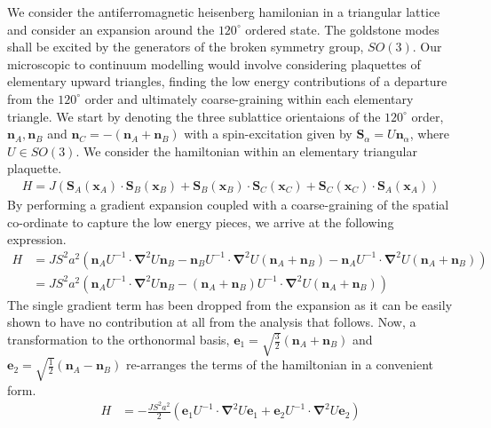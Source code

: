 \documentclass[notitlepage,onecolumn,showpacs,11pt]{revtex4-1}
\newcommand{\mbf}[1]{\mathbf{#1}}
\newcommand{\grad}{\boldsymbol{\nabla}}
\begin{document}
We consider the antiferromagnetic heisenberg hamilonian in a triangular lattice and consider 
an expansion around the $120^\circ$ ordered state. The goldstone modes shall be excited by
the generators of the broken symmetry group, $SO(3)$. Our microscopic to continuum modelling 
would involve considering plaquettes of elementary upward triangles, finding the low energy
contributions of a departure from the $120^\circ$ order and ultimately coarse-graining within 
each elementary triangle. We start by denoting the three sublattice orientaions of the 
$120^\circ$ order, $\mbf{n}_A,\mbf{n}_B$ and $\mbf{n}_C = -(\mbf{n}_A+\mbf{n}_B)$ with a
spin-excitation given by $\mbf{S}_\alpha=U\mbf{n}_\alpha$, where $U\in SO(3)$. We consider the
hamiltonian within an elementary triangular plaquette.
\begin{equation}
    \begin{aligned}
        H = J \left(\mbf{S}_A(\mbf{x}_A)\cdot\mbf{S}_B(\mbf{x}_B)
        +\mbf{S}_B(\mbf{x}_B)\cdot\mbf{S}_C(\mbf{x}_C)
        +\mbf{S}_C(\mbf{x}_C)\cdot\mbf{S}_A(\mbf{x}_A)
        \right) 
    \end{aligned}
\end{equation}
By performing a gradient expansion coupled with a coarse-graining of the spatial co-ordinate to 
capture the low energy pieces, we arrive at the following expression.
\begin{equation}
    \begin{aligned}
        H &= JS^2a^2 \left(\mbf{n}_A U^{-1}\cdot\grad^2U\mbf{n}_B
        -\mbf{n}_B U^{-1}\cdot\grad^2U(\mbf{n}_A+\mbf{n}_B)
        -\mbf{n}_A U^{-1}\cdot\grad^2U(\mbf{n}_A+\mbf{n}_B)
        \right)\\
        &= JS^2a^2 \left(\mbf{n}_A U^{-1}\cdot\grad^2U\mbf{n}_B
        -(\mbf{n}_A+\mbf{n}_B)U^{-1}\cdot\grad^2U(\mbf{n}_A+\mbf{n}_B)
        \right) 
    \end{aligned}
\end{equation}
The single gradient term has been dropped from the expansion as it can be easily shown to have
no contribution at all from the analysis that follows. Now, a transformation to the orthonormal basis, 
$\mbf{e}_1=\sqrt{\frac{3}{2}}\left(\mbf{n}_A+\mbf{n}_B\right)$ and 
$\mbf{e}_2=\sqrt{\frac{1}{2}}\left(\mbf{n}_A-\mbf{n}_B\right)$ re-arranges the terms of the 
hamiltonian in a convenient form.
\begin{equation}
    \begin{aligned}
        H &= -\frac{JS^2a^2}{2} \left(\mbf{e}_1 U^{-1}\cdot\grad^2U\mbf{e}_1
        +\mbf{e}_2 U^{-1}\cdot\grad^2U\mbf{e}_2
        \right)
    \end{aligned}
\end{equation}
\end{document}

